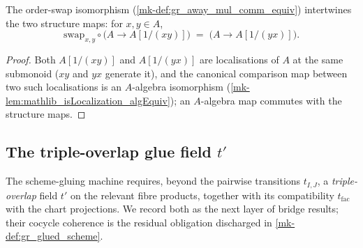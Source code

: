 \begin{lemma}\label{mk-lem:gr_awayMulCommEquiv_comp_algebraMap}
  \leanok

  The order-swap isomorphism (\ref{mk-def:gr_away_mul_comm_equiv}) intertwines the
  two structure maps: for \(x, y \in A\),
  \[
    \mathrm{swap}_{x,y} \circ \bigl(A \to A[1/(xy)]\bigr)
      \;=\; \bigl(A \to A[1/(yx)]\bigr).
  \]
\end{lemma}
\begin{proof}
  \leanok
  Both \(A[1/(xy)]\) and \(A[1/(yx)]\) are localisations of \(A\) at the same
  submonoid (\(xy\) and \(yx\) generate it), and the canonical comparison map
  between two such localisations is an \(A\)-algebra isomorphism
  (\ref{mk-lem:mathlib_isLocalization_algEquiv}); an \(A\)-algebra map commutes with
  the structure maps.
\end{proof}


\subsection*{The triple-overlap glue field \(t'\)}

The scheme-gluing machine requires, beyond the pairwise transitions \(t_{I,J}\), a
\emph{triple-overlap} field \(t'\) on the relevant fibre products, together with
its compatibility \(t_{\mathrm{fac}}\) with the chart projections. We record both
as the next layer of bridge results; their cocycle coherence is the residual
obligation discharged in \ref{mk-def:gr_glued_scheme}.

